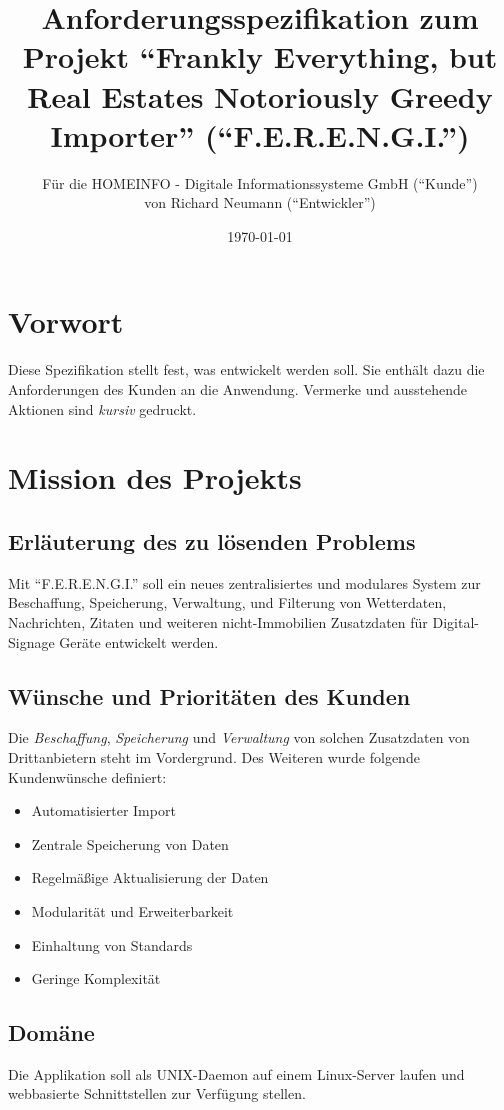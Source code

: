 \documentclass[a4paper]{article}
\title{Anforderungsspezifikation zum Projekt \newline \enquote{Frankly Everything, but Real Estates Notoriously Greedy Importer} (\enquote{F.E.R.E.N.G.I.})}
\author{Für die HOMEINFO - Digitale Informationssysteme GmbH (\enquote{Kunde}) \\ 
	von Richard Neumann (\enquote{Entwickler})}
\date{\today}
\begin{document}
	
	\maketitle
	\pagebreak
	
	\tableofcontents
	\pagebreak
	
	\section*{Vorwort}
	Diese Spezifikation stellt fest, was entwickelt werden soll. Sie enthält dazu die Anforderungen des Kunden an die Anwendung.
	Vermerke und ausstehende Aktionen sind \emph{kursiv} gedruckt.
	
	\pagebreak
	\section{Mission des Projekts}
	\subsection{Erläuterung des zu lösenden Problems}
	Mit \enquote{F.E.R.E.N.G.I.} soll ein neues zentralisiertes und modulares System zur Beschaffung, Speicherung, Verwaltung, und Filterung von Wetterdaten, Nachrichten, Zitaten und weiteren nicht-Immobilien Zusatzdaten für Digital-Signage Geräte entwickelt werden. 
	\subsection{Wünsche und Prioritäten des Kunden}
	Die \emph{Beschaffung}, \emph{Speicherung} und \emph{Verwaltung} von solchen Zusatzdaten von Drittanbietern steht im Vordergrund.
	Des Weiteren wurde folgende Kundenwünsche definiert:
	\begin{itemize}
		\item Automatisierter Import
		\item Zentrale Speicherung von Daten
		\item Regelmäßige Aktualisierung der Daten
		\item Modularität und Erweiterbarkeit
		\item Einhaltung von Standards
		\item Geringe Komplexität
	\end{itemize}
		
	\subsection{Domäne}
	Die Applikation soll als UNIX-Daemon auf einem Linux-Server laufen und webbasierte Schnittstellen zur Verfügung stellen.
	
\end{document}
